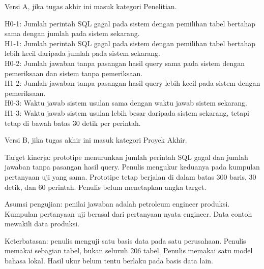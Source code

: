 Versi A, jika tugas akhir ini masuk kategori Penelitian.

H0-1: Jumlah perintah SQL gagal pada sistem dengan pemilihan tabel bertahap sama dengan jumlah pada sistem sekarang.\\
H1-1: Jumlah perintah SQL gagal pada sistem dengan pemilihan tabel bertahap lebih kecil daripada jumlah pada sistem sekarang.\\
H0-2: Jumlah jawaban tanpa pasangan hasil query sama pada sistem dengan pemeriksaan dan sistem tanpa pemeriksaan.\\
H1-2: Jumlah jawaban tanpa pasangan hasil query lebih kecil pada sistem dengan pemeriksaan.\\
H0-3: Waktu jawab sistem usulan sama dengan waktu jawab sistem sekarang.\\
H1-3: Waktu jawab sistem usulan lebih besar daripada sistem sekarang, tetapi tetap di bawah batas 30 detik per perintah.

Versi B, jika tugas akhir ini masuk kategori Proyek Akhir.

Target kinerja: prototipe menurunkan jumlah perintah SQL gagal dan jumlah jawaban tanpa pasangan hasil query. Penulis mengukur keduanya pada kumpulan pertanyaan uji yang sama. Prototipe tetap berjalan di dalam batas 300 baris, 30 detik, dan 60 perintah. Penulis belum menetapkan angka target.

Asumsi pengujian: penilai jawaban adalah petroleum engineer produksi. Kumpulan pertanyaan uji berasal dari pertanyaan nyata engineer. Data contoh mewakili data produksi.

Keterbatasan: penulis menguji satu basis data pada satu perusahaan. Penulis memakai sebagian tabel, bukan seluruh 206 tabel. Penulis memakai satu model bahasa lokal. Hasil ukur belum tentu berlaku pada basis data lain.


